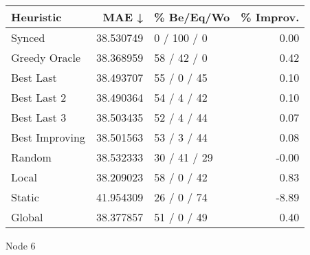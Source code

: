 \begin{tabular}{lrlr}
\toprule
      Heuristic &      MAE ↓ &    \% Be/Eq/Wo & \% Improv. \\
\midrule
         Synced &  38.530749 &   0 / 100 / 0 &      0.00 \\
  Greedy Oracle &  38.368959 &   58 / 42 / 0 &      0.42 \\
      Best Last &  38.493707 &   55 / 0 / 45 &      0.10 \\
    Best Last 2 &  38.490364 &   54 / 4 / 42 &      0.10 \\
    Best Last 3 &  38.503435 &   52 / 4 / 44 &      0.07 \\
 Best Improving &  38.501563 &   53 / 3 / 44 &      0.08 \\
         Random &  38.532333 &  30 / 41 / 29 &     -0.00 \\
          Local &  38.209023 &   58 / 0 / 42 &      0.83 \\
         Static &  41.954309 &   26 / 0 / 74 &     -8.89 \\
         Global &  38.377857 &   51 / 0 / 49 &      0.40 \\
\bottomrule
\end{tabular}
\caption{Node 6}
\label{tab:non_lr005_le1_bs2_6}
